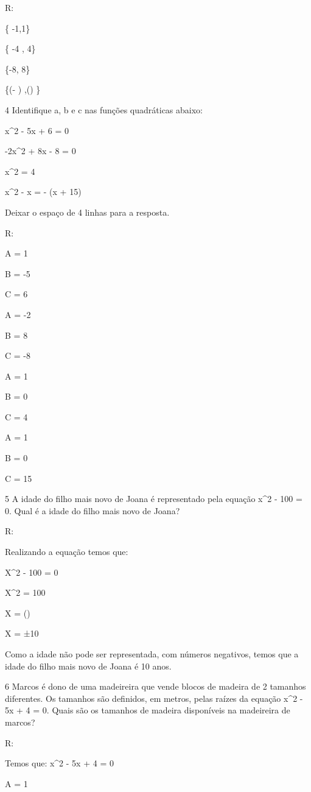 {R:
\item \{ -1,1\}
\item \{ -4 , 4\}
\item \{-8, 8\}
\item \{(- ) ,() \}

\num{4} Identifique a, b e c nas funções quadráticas abaixo:
\item x^2 - 5x + 6 = 0
\item -2x^2 + 8x - 8 = 0
\item x^2 = 4
\item x^2 - x = - (x + 15)

Deixar o espaço de 4 linhas para a resposta.

R:
\item

A = 1

B = -5

C = 6
\item

A = -2

B = 8

C = -8
\item

A = 1

B = 0

C = 4
\item

A = 1

B = 0

C = 15

\num{5} A idade do filho mais novo de Joana é representado pela equação x^2 -
100 = 0. Qual é a idade do filho mais novo de Joana?

R:

Realizando a equação temos que:

X^2 - 100 = 0

X^2 = 100

X = ()

X = ±10

Como a idade não pode ser representada, com números negativos, temos que
a idade do filho mais novo de Joana é 10 anos.

\num{6} Marcos é dono de uma madeireira que vende blocos de madeira de 2
tamanhos diferentes. Os tamanhos são definidos, em metros, pelas raízes
da equação x^2 - 5x + 4 = 0. Quais são os tamanhos de madeira disponíveis
na madeireira de marcos?

R:

Temos que: x^2 - 5x + 4 = 0

A = 1

}
